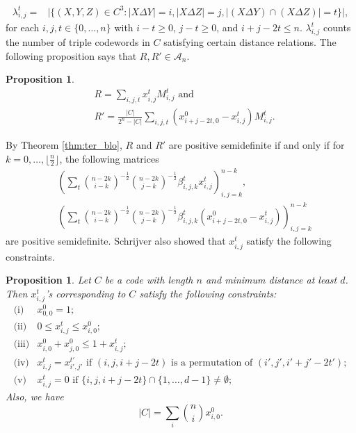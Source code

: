 \documentclass[final,onecolumn]{IEEEtran}
\newtheorem{propositionenv}[definitionenv]{Proposition}
\newenvironment{proposition}{\begin{propositionenv}\rm}{\end{propositionenv}}
\theoremstyle{definition}
\newcommand{\cA}{{\mathcal A}}
\begin{document}
\begin{align*}
	\lambda_{i, j}^{t} = &\lvert \{ (X, Y, Z) \in C^{3} : \lvert X \Delta 
	Y \rvert = i, \lvert X \Delta Z \rvert = j, \lvert (X \Delta Y) \cap (X \Delta Z)\rvert = t\}\rvert,
\end{align*}
for each $i, j, t \in \{0, \dots, n\}$ with $i-t \geq 0$, $j-t \geq 0$, and $i+j-2t \leq n$. $\lambda_{i, j}^{t}$ counts the number of triple codewords in $C$ satisfying certain distance relations.  The following proposition says that $R,R'\in\cA_n$.
\begin{proposition} \cite[Proposition $1$]{Sch05}
	\begin{align*}
		& R = \sum_{i, j, t} x_{i, j}^{t} M_{i, j}^{t} \text{ and }\\
		& R' = \frac{\lvert C \rvert}{2^{n}-\lvert C \rvert}\sum_{i, j, t}(x_{i+j-2t, 0}^{0}-x_{i, j}^{t})M_{i, j}^{t}.
	\end{align*}
\end{proposition}
By Theorem \ref{thm:ter_blo}, $R$ and $R'$ are  positive semidefinite if and only if for $k = 0, \dots, \lfloor \frac{n}{2} \rfloor$, the following matrices
\begin{align}
	& \left( \sum_{t} \binom{n-2k}{i-k}^{-\frac{1}{2}} \binom{n-2k}{j-k}^{-\frac{1}{2}} \beta_{i, j, k}^{t} x_{i, j}^{t} \right)_{i, j = k}^{n-k}, \label{sdp_1}\\
	& \left( \sum_{t} \binom{n-2k}{i-k}^{-\frac{1}{2}} \binom{n-2k}{j-k}^{-\frac{1}{2}} \beta_{i, j, k}^{t} (x_{i+j-2t, 0}^{0}-x_{i, j}^{t}) \right)_{i, j = k}^{n-k} \label{sdp_2}
\end{align}
are positive semidefinite. Schrijver also showed that $x_{i,j}^t$ satisfy the following constraints. 
\begin{proposition} \cite{Sch05}
	\label{pro:sch}
	Let $C$ be a code with length $n$ and minimum distance at least $d$. Then $x_{i, j}^{t}$'s corresponding to $C$ satisfy the following constraints:
	\begin{equation}
		\begin{array}{cl}
			\mbox{(i)}     &  x_{0, 0}^{0} = 1;\\
			\text{(ii)}    & 0 \leq x_{i, j}^{t} \leq x_{i, 0}^{0};\\
			\text{(iii)}    & x_{i,0}^{0} + x_{j,0}^{0} \leq  1+x_{i, j}^{t};\\
			\text{(iv)}    & x_{i, j}^{t} = x_{i', j'}^{t'}  \mbox{ if } (i, j, i+j-2t) \mbox{ is a permutation of } (i', j', i'+j'-2t');\\
			\text{(v)}    & x_{i, j}^{t} = 0 \mbox{ if }\{i, j, i+j-2t\} \cap \{1, \dots, d-1\} \neq \emptyset;
		\end{array} \label{sdp_3}
	\end{equation}
	Also, we have
	\begin{equation*}
		\lvert C \rvert = \sum_{i}\binom{n}{i}x_{i, 0}^{0}.
	\end{equation*}
\end{proposition}
\end{document}
